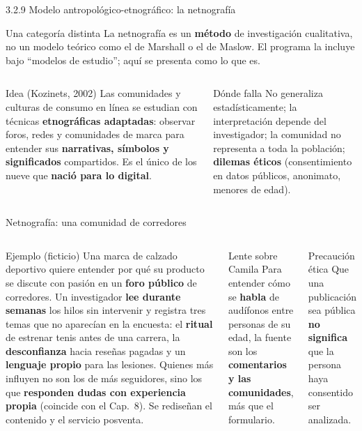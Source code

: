 \documentclass[aspectratio=169,xcolor=dvipsnames]{beamer}
\begin{document}
\begin{frame}{3.2.9 Modelo antropológico-etnográfico: la netnografía}
\begin{alertblock}{Una categoría distinta}
  \footnotesize La netnografía es un \textbf{método} de investigación cualitativa, no un modelo teórico como el de Marshall o el de Maslow. El programa la incluye bajo \enquote{modelos de estudio}; aquí se presenta como lo que es.
\end{alertblock}
\begin{columns}[T]
  \begin{block}{Idea (Kozinets, 2002)}
    \footnotesize Las comunidades y culturas de consumo en línea se estudian con técnicas \textbf{etnográficas adaptadas}: observar foros, redes y comunidades de marca para entender sus \textbf{narrativas, símbolos y significados} compartidos. Es el único de los nueve que \textbf{nació para lo digital}.
  \end{block}
  \begin{block}{Dónde falla}
    \footnotesize No generaliza estadísticamente; la interpretación depende del investigador; la comunidad no representa a toda la población; \textbf{dilemas éticos} (consentimiento en datos públicos, anonimato, menores de edad).
  \end{block}
\end{columns}
\end{frame}

\begin{frame}{Netnografía: una comunidad de corredores}
\begin{columns}[T]
  \begin{exampleblock}{Ejemplo (ficticio)}
    \footnotesize Una marca de calzado deportivo quiere entender por qué su producto se discute con pasión en un \textbf{foro público} de corredores. Un investigador \textbf{lee durante semanas} los hilos sin intervenir y registra tres temas que no aparecían en la encuesta: el \textbf{ritual} de estrenar tenis antes de una carrera, la \textbf{desconfianza} hacia reseñas pagadas y un \textbf{lenguaje propio} para las lesiones. Quienes más influyen no son los de más seguidores, sino los que \textbf{responden dudas con experiencia propia} (coincide con el Cap.~8). Se rediseñan el contenido y el servicio posventa.
  \end{exampleblock}
  \begin{alertblock}{Lente sobre Camila}
    \small Para entender cómo se \textbf{habla} de audífonos entre personas de su edad, la fuente son los \textbf{comentarios y las comunidades}, más que el formulario.
  \end{alertblock}
  \begin{block}{Precaución ética}
    \footnotesize Que una publicación sea pública \textbf{no significa} que la persona haya consentido ser analizada.
  \end{block}
\end{columns}
\end{frame}
\end{document}
